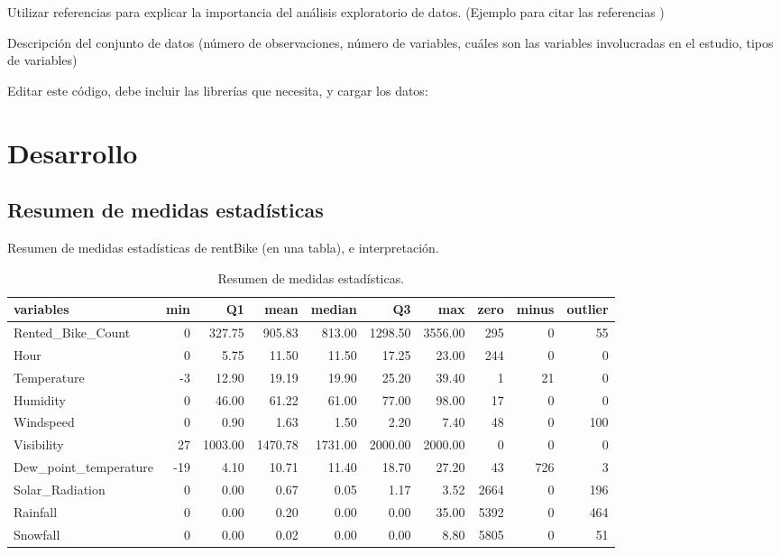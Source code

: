 \documentclass[]{elsarticle} %
\begin{document}
Utilizar referencias para explicar la importancia del análisis
exploratorio de datos. (Ejemplo para citar las referencias
\citep{provost2013data})

Descripción del conjunto de datos (número de observaciones, número de
variables, cuáles son las variables involucradas en el estudio, tipos de
variables)

Editar este código, debe incluir las librerías que necesita, y cargar
los datos:

\newpage
\section{Desarrollo}

\subsection{Resumen de medidas estadísticas}

Resumen de medidas estadísticas de rentBike (en una tabla), e
interpretación.

\begin{table}

\caption{\label{tab:tab1}\label{tab:tab1}Resumen de medidas estadísticas.}
\centering
\begin{tabular}[t]{l|r|r|r|r|r|r|r|r|r}
\hline
variables & min & Q1 & mean & median & Q3 & max & zero & minus & outlier\\
\hline
Rented\_Bike\_Count & 0 & 327.75 & 905.83 & 813.00 & 1298.50 & 3556.00 & 295 & 0 & 55\\
\hline
Hour & 0 & 5.75 & 11.50 & 11.50 & 17.25 & 23.00 & 244 & 0 & 0\\
\hline
Temperature & -3 & 12.90 & 19.19 & 19.90 & 25.20 & 39.40 & 1 & 21 & 0\\
\hline
Humidity & 0 & 46.00 & 61.22 & 61.00 & 77.00 & 98.00 & 17 & 0 & 0\\
\hline
Windspeed & 0 & 0.90 & 1.63 & 1.50 & 2.20 & 7.40 & 48 & 0 & 100\\
\hline
Visibility & 27 & 1003.00 & 1470.78 & 1731.00 & 2000.00 & 2000.00 & 0 & 0 & 0\\
\hline
Dew\_point\_temperature & -19 & 4.10 & 10.71 & 11.40 & 18.70 & 27.20 & 43 & 726 & 3\\
\hline
Solar\_Radiation & 0 & 0.00 & 0.67 & 0.05 & 1.17 & 3.52 & 2664 & 0 & 196\\
\hline
Rainfall & 0 & 0.00 & 0.20 & 0.00 & 0.00 & 35.00 & 5392 & 0 & 464\\
\hline
Snowfall & 0 & 0.00 & 0.02 & 0.00 & 0.00 & 8.80 & 5805 & 0 & 51\\
\hline
\end{tabular}
\end{table}
\newpage
\end{document}
